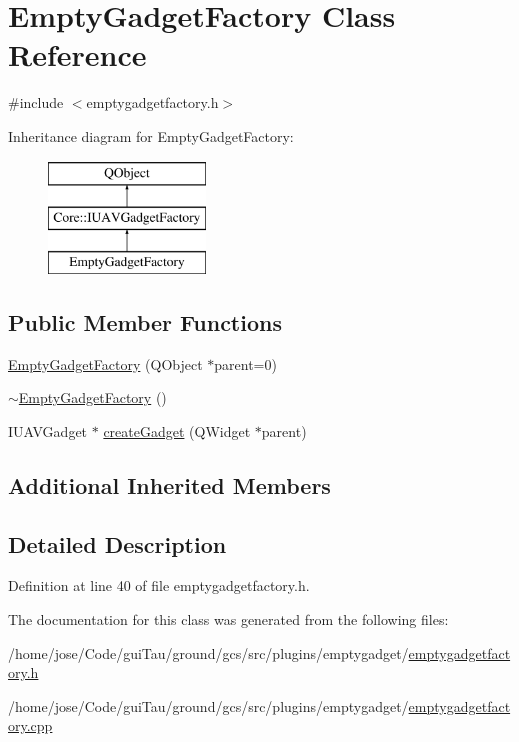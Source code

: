 \hypertarget{class_empty_gadget_factory}{\section{Empty\-Gadget\-Factory Class Reference}
\label{class_empty_gadget_factory}
}


{\ttfamily \#include $<$emptygadgetfactory.\-h$>$}

Inheritance diagram for Empty\-Gadget\-Factory\-:\begin{figure}[H]
\begin{center}
\leavevmode
\includegraphics[height=3.000000cm]{class_empty_gadget_factory}
\end{center}
\end{figure}
\subsection*{Public Member Functions}
\begin{DoxyCompactItemize}
\item 
\hyperlink{group___empty_gadget_plugin_gaf98a291f00c46f8dfde8d7c9d6f8fb6c}{Empty\-Gadget\-Factory} (Q\-Object $\ast$parent=0)
\item 
\hyperlink{group___empty_gadget_plugin_gabec68115923f555ddd7cc38ba7a3ee80}{$\sim$\-Empty\-Gadget\-Factory} ()
\item 
I\-U\-A\-V\-Gadget $\ast$ \hyperlink{group___empty_gadget_plugin_gaf091c2a41b028c469236b6ad70d4addf}{create\-Gadget} (Q\-Widget $\ast$parent)
\end{DoxyCompactItemize}
\subsection*{Additional Inherited Members}


\subsection{Detailed Description}


Definition at line 40 of file emptygadgetfactory.\-h.



The documentation for this class was generated from the following files\-:\begin{DoxyCompactItemize}
\item 
/home/jose/\-Code/gui\-Tau/ground/gcs/src/plugins/emptygadget/\hyperlink{emptygadgetfactory_8h}{emptygadgetfactory.\-h}\item 
/home/jose/\-Code/gui\-Tau/ground/gcs/src/plugins/emptygadget/\hyperlink{emptygadgetfactory_8cpp}{emptygadgetfactory.\-cpp}\end{DoxyCompactItemize}

